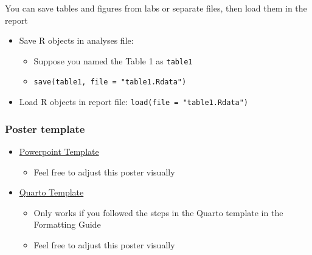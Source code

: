 \documentclass[
  letterpaper,
  DIV=11,
  numbers=noendperiod]{scrartcl}
\providecommand{\tightlist}{%
  \setlength{\itemsep}{0pt}\setlength{\parskip}{0pt}}\usepackage{longtable,booktabs,array}
\begin{document}
\begin{tcolorbox}[enhanced jigsaw, opacityback=0, opacitybacktitle=0.6, rightrule=.15mm, toprule=.15mm, left=2mm, toptitle=1mm, breakable, colback=white, bottomtitle=1mm, arc=.35mm, leftrule=.75mm, titlerule=0mm, title=\textcolor{quarto-callout-note-color}{\faInfo}\hspace{0.5em}{The project report is a separate file from the labs}, bottomrule=.15mm, coltitle=black, colbacktitle=quarto-callout-note-color!10!white, colframe=quarto-callout-note-color-frame]

You can save tables and figures from labs or separate files, then load
them in the report

\begin{itemize}
\tightlist
\item
  Save R objects in analyses file:

  \begin{itemize}
  \tightlist
  \item
    Suppose you named the Table 1 as \texttt{table1}
  \item
    \texttt{save(table1,\ file\ =\ "table1.Rdata")}
  \end{itemize}
\item
  Load R objects in report file: \texttt{load(file\ =\ "table1.Rdata")}
\end{itemize}

\end{tcolorbox}

\subsubsection{Poster template}\label{poster-template}

\begin{itemize}
\tightlist
\item
  \href{https://ohsuitg-my.sharepoint.com/:p:/r/personal/wakim_ohsu_edu/Documents/Teaching/Classes/W25_BSTA_512_612/Student_files/Project/Resources/poster_template.pptx?d=w171b4f2e4f1d4ee1a72f499f15d736af&csf=1&web=1&e=Nsqqqs}{Powerpoint
  Template}

  \begin{itemize}
  \tightlist
  \item
    Feel free to adjust this poster visually
  \end{itemize}
\item
  \href{../labs/Poster-example.qmd}{Quarto Template}

  \begin{itemize}
  \tightlist
  \item
    Only works if you followed the steps in the Quarto template in the
    Formatting Guide
  \item
    Feel free to adjust this poster visually
  \end{itemize}
\end{itemize}
\end{document}
